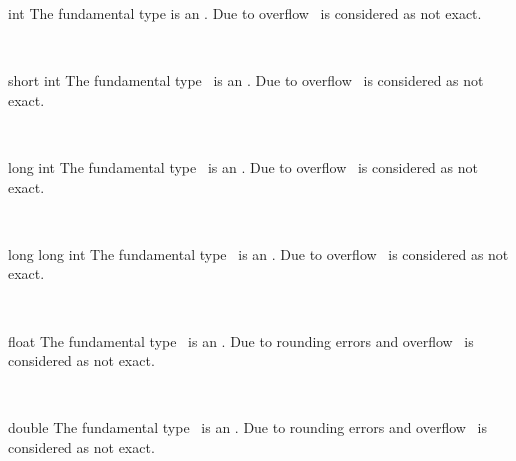\ccDefGlobalScope{}

\begin{ccRefClass}{int}
\ccDefinition
The fundamental type  is an  . 
Due to overflow \ccRefName\ is considered as not exact. 

\ccIsModel
{}\\
\end{ccRefClass}


\begin{ccRefClass}{short int}
\ccDefinition
The fundamental type \ccRefName\ is an  
. Due to overflow \ccRefName\ is considered as not exact.
 
\ccIsModel
{}\\
\end{ccRefClass}

\begin{ccRefClass}{long int}
\ccDefinition
The fundamental type \ccRefName\ is an  
. Due to overflow \ccRefName\ is considered as not exact. 

\ccIsModel
{}\\
\end{ccRefClass}


\begin{ccRefClass}{long long int}
\ccDefinition
The fundamental type \ccRefName\ is an  
. Due to overflow \ccRefName\ is considered as not exact.
 
\ccIsModel
{}\\
\end{ccRefClass}


\begin{ccRefClass}{float}
\ccDefinition
The fundamental type \ccRefName\ is an  
. Due to rounding errors and overflow \ccRefName\ is 
considered as not exact.
 
\ccIsModel
{}\\
\end{ccRefClass}


\begin{ccRefClass}{double}
\ccDefinition
The fundamental type \ccRefName\ is an  
. Due to rounding errors and overflow \ccRefName\ is 
considered as not exact.
 
\ccIsModel
{}\\
\end{ccRefClass}

